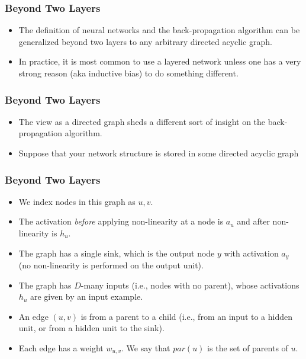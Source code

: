 \documentclass[trans]{beamer}
\begin{document}


\begin{frame}
  \frametitle{Beyond Two Layers}
\begin{itemize}
\item
The definition of neural networks and the back-propagation algorithm
can be generalized beyond two layers to any arbitrary directed acyclic
graph. 
\item In practice, it is most common to use a layered network unless one has a very
strong reason (aka inductive bias) to do something different.
\end{itemize}
\end{frame}

\begin{frame}
  \frametitle{Beyond Two Layers}
\begin{itemize}
\item
The view as a directed graph sheds a different sort of
insight on the back-propagation algorithm.
\item Suppose that your network structure is stored in some directed acyclic
graph
\end{itemize}
\end{frame}

\begin{frame}
  \frametitle{Beyond Two Layers}
\begin{itemize}
\item
 We index nodes in this
graph as $u,v$.  
\item The activation \emph{before} applying non-linearity
at a node is $a_u$ and after non-linearity is $h_u$.  
\item The graph has a
single sink, which is the output node $y$ with activation $a_y$ (no
non-linearity is performed on the output unit). 
\item  The graph has
$D$-many inputs (i.e., nodes with no parent), whose activations $h_u$
are given by an input example.  
\item An edge $(u,v)$ is from a parent to a
child (i.e., from an input to a hidden unit, or from a hidden unit to
the sink). 
\item Each edge has a weight $w_{u,v}$.  We say that
$\textit{par}(u)$ is the set of parents of $u$.
\end{itemize}
\end{frame}
\end{document}
